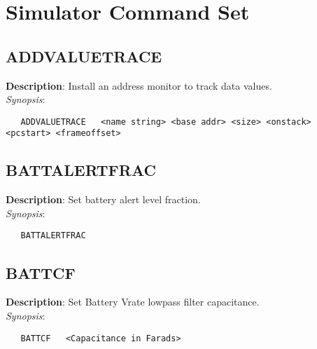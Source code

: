 \section{Simulator Command Set}

\subsection{\bf ADDVALUETRACE}
\label{manpages:ADDVALUETRACE}
\label{manpages:addvaluetrace}
\vspace{-0.2in}
{\bf Description}: 	Install an address monitor to track data values.\\[1.5ex]
{\em Synopsis}:
\vspace{-0.2in}
\scriptsize
\begin{verbatim}
   ADDVALUETRACE   <name string> <base addr> <size> <onstack> <pcstart> <frameoffset>
\end{verbatim}
\normalsize
\vspace{-0.2in}


\subsection{\bf BATTALERTFRAC}
\label{manpages:BATTALERTFRAC}
\label{manpages:battalertfrac}
\vspace{-0.2in}
{\bf Description}: 	Set battery alert level fraction.\\[1.5ex]
{\em Synopsis}:
\vspace{-0.2in}
\scriptsize
\begin{verbatim}
   BATTALERTFRAC   				
\end{verbatim}
\normalsize
\vspace{-0.2in}


\subsection{\bf BATTCF}
\label{manpages:BATTCF}
\label{manpages:battcf}
\vspace{-0.2in}
{\bf Description}: 	Set Battery Vrate lowpass filter capacitance.\\[1.5ex]
{\em Synopsis}:
\vspace{-0.2in}
\scriptsize
\begin{verbatim}
   BATTCF   <Capacitance in Farads>	
\end{verbatim}
\normalsize
\vspace{-0.2in}


